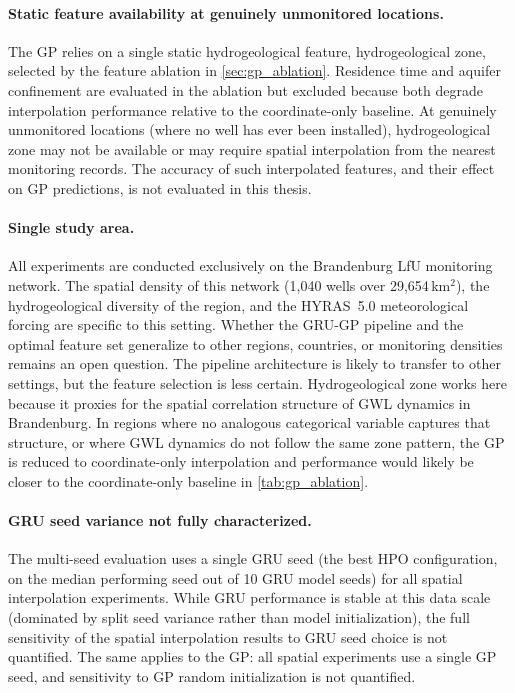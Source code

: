 \paragraph{Static feature availability at genuinely unmonitored locations.}
The GP relies on a single static hydrogeological feature, hydrogeological zone, selected by the feature ablation in \cref{sec:gp_ablation}. Residence time and aquifer confinement are evaluated in the ablation but excluded because both degrade interpolation performance relative to the coordinate-only baseline. At genuinely unmonitored locations (where no well has ever been installed), hydrogeological zone may not be available or may require spatial interpolation from the nearest monitoring records. The accuracy of such interpolated features, and their effect on GP predictions, is not evaluated in this thesis.

\paragraph{Single study area.}
All experiments are conducted exclusively on the Brandenburg LfU monitoring network. The spatial density of this network (1{,}040 wells over 29{,}654\,km$^2$), the hydrogeological diversity of the region, and the HYRAS~5.0 meteorological forcing are specific to this setting. Whether the GRU-GP pipeline and the optimal feature set generalize to other regions, countries, or monitoring densities remains an open question. The pipeline architecture is likely to transfer to other settings, but the feature selection is less certain. Hydrogeological zone works here because it proxies for the spatial correlation structure of GWL dynamics in Brandenburg. In regions where no analogous categorical variable captures that structure, or where GWL dynamics do not follow the same zone pattern, the GP is reduced to coordinate-only interpolation and performance would likely be closer to the coordinate-only baseline in \cref{tab:gp_ablation}.

\paragraph{GRU seed variance not fully characterized.}
The multi-seed evaluation uses a single GRU seed (the best HPO configuration, on the median performing seed out of 10 GRU model seeds) for all spatial interpolation experiments. While GRU performance is stable at this data scale (dominated by split seed variance rather than model initialization), the full sensitivity of the spatial interpolation results to GRU seed choice is not quantified. The same applies to the GP: all spatial experiments use a single GP seed, and sensitivity to GP random initialization is not quantified.

